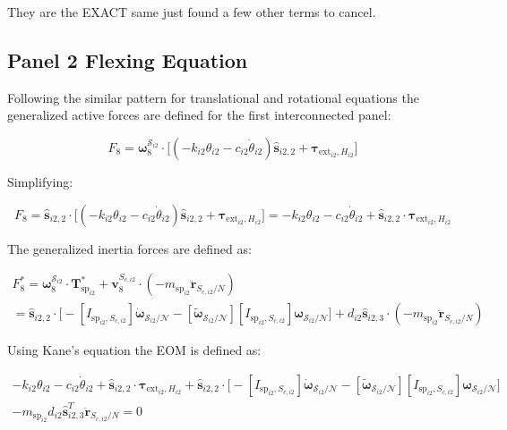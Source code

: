 \documentclass[paper]{aiaaNew}
\begin{document}
They are the EXACT same just found a few other terms to cancel.

\subsection{Panel 2 Flexing Equation}
Following the similar pattern for translational and rotational equations the generalized active forces are defined for the first interconnected panel:

\begin{equation}
F_{8} = \bm \omega_{8}^{\mathcal{S}_{i2}} \cdot \Big[  (-k_{i2} \theta_{i2} - c_{i2} \dot{\theta}_{i2})\bm{\hat{s}}_{i2,2} + \bm \tau_{\text{ext}_{i2},H_{i2}} \Big]
\end{equation}

Simplifying:

\begin{equation}
F_{8} = \bm{\hat{s}}_{i2,2} \cdot \Big[  (-k_{i2} \theta_{i2} - c_{i2} \dot{\theta}_{i2})\bm{\hat{s}}_{i2,2} + \bm \tau_{\text{ext}_{i2},H_{i2}} \Big] = -k_{i2} \theta_{i2} - c_{i2} \dot{\theta}_{i2} + \bm{\hat{s}}_{i2,2} \cdot \bm \tau_{\text{ext}_{i2},H_{i2}}
\end{equation}

The generalized inertia forces are defined as: 

\begin{multline}
F^*_{8} = \bm \omega_{\textit{8}}^{\mathcal{S}_{i2}} \cdot \bm T^*_{\text{sp}_{i2}}  + \bm v^{S_{c,i2}}_{8} \cdot (-m_{\text{sp}_{i2}} \ddot{\bm{r}}_{S_{c,i2}/N}) \\
= \bm{\hat{s}}_{i2,2} \cdot \Big[-[I_{\text{sp}_{i2},S_{c,i2}}] \dot{\bm\omega}_{\mathcal{S}_{i2}/\mathcal{N}}  -[\tilde{\bm \omega}_{\mathcal{S}_{i2}/\mathcal{N}}] [I_{\text{sp}_{i2},S_{c,i2}}] \bm \omega_{\mathcal{S}_{i2}/\mathcal{N}} \Big] + d_{i2}\bm{\hat{s}}_{i2,3} \cdot (-m_{\text{sp}_{i2}} \ddot{\bm{r}}_{S_{c,i2}/N})
\end{multline}

Using Kane's equation the EOM is defined as:

\begin{multline}
-k_{i2} \theta_{i2} - c_{i2} \dot{\theta}_{i2} + \bm{\hat{s}}_{i2,2} \cdot \bm \tau_{\text{ext}_{i2},H_{i2}} + \bm{\hat{s}}_{i2,2} \cdot \Big[-[I_{\text{sp}_{i2},S_{c,i2}}] \dot{\bm\omega}_{\mathcal{S}_{i2}/\mathcal{N}}  -[\tilde{\bm \omega}_{\mathcal{S}_{i2}/\mathcal{N}}] [I_{\text{sp}_{i2},S_{c,i2}}] \bm \omega_{\mathcal{S}_{i2}/\mathcal{N}} \Big] \\
- m_{\text{sp}_{i2}} d_{i2}\bm{\hat{s}}_{i2,3}^T \ddot{\bm{r}}_{S_{c,i2}/N} = 0
\end{multline}
\end{document}
